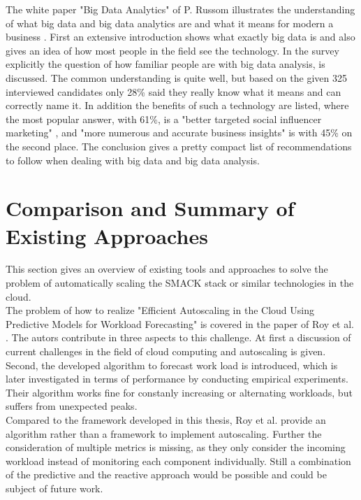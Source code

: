 The white paper "Big Data Analytics" of P. Russom illustrates the understanding of what big data and big data analytics are and what it means for modern a business \cite{russom2011big}.
First an extensive introduction shows what exactly big data is and also gives an idea of how most people in the field see the technology.
In the survey explicitly the question of how familiar people are with big data analysis, is discussed.
The common understanding is quite well, but based on the given 325 interviewed candidates only 28\% said they really know what it means and can correctly name it.
In addition the benefits of such a technology are listed, where the most popular answer, with 61\%, is a "better targeted social influencer marketing" \cite{russom2011big}, and "more numerous and accurate business insights" \cite{russom2011big} is with 45\% on the second place.
The conclusion gives a pretty compact list of recommendations to follow when dealing with big data and big data analysis.\\


\section{Comparison and Summary of Existing Approaches}
This section gives an overview of existing tools and approaches to solve the problem of automatically scaling the SMACK stack or similar technologies in the cloud.\\

The problem of how to realize "Efficient Autoscaling in the Cloud Using Predictive Models for Workload Forecasting" is covered in the paper of Roy et al. \cite{roy2011efficient}.
The autors contribute in three aspects to this challenge.
At first a discussion of current challenges in the field of cloud computing and autoscaling is given.
Second, the developed algorithm to forecast work load is introduced, which is later investigated in terms of performance by conducting empirical experiments.
Their algorithm works fine for constanly increasing or alternating workloads, but suffers from unexpected peaks.\\
Compared to the framework developed in this thesis, Roy et al. provide an algorithm rather than a framework to implement autoscaling.
Further the consideration of multiple metrics is missing, as they only consider the incoming workload instead of monitoring each component individually.
Still a combination of the predictive and the reactive approach would be possible and could be subject of future work.\\

